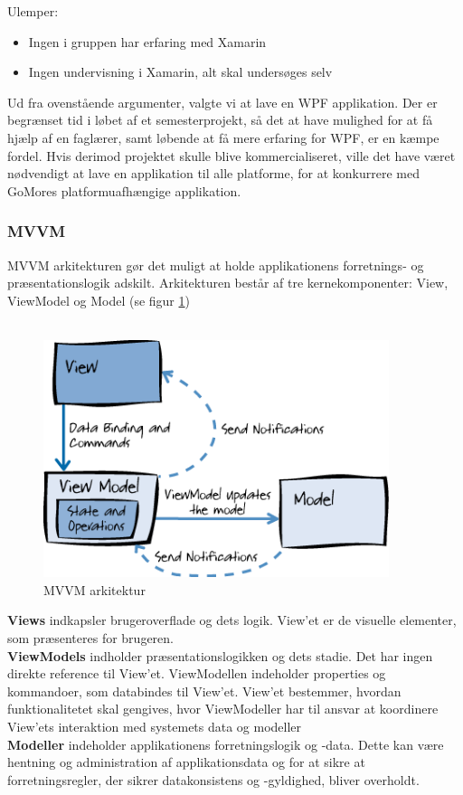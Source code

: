 \documentclass[a4paper,12pt,fleqn,oneside]{article}
\begin{document}
Ulemper: \\
\begin{itemize}
    \item Ingen i gruppen har erfaring med Xamarin 
    \item Ingen undervisning i Xamarin, alt skal undersøges selv
\end{itemize}
Ud fra ovenstående argumenter, valgte vi at lave en WPF applikation. Der er begrænset tid i løbet af et semesterprojekt, så det at have mulighed for at få hjælp af en faglærer, samt løbende at få mere erfaring for WPF, er en kæmpe fordel. Hvis derimod projektet skulle blive kommercialiseret, ville det have været nødvendigt at lave en applikation til alle platforme, for at konkurrere med GoMores platformuafhængige applikation. 
\subsubsection{MVVM}
MVVM arkitekturen gør det muligt at holde applikationens forretnings- og præsentationslogik adskilt. Arkitekturen består af tre kernekomponenter: View, ViewModel og Model (se figur \ref{fig:MVVM_pic}) \\\\
\begin{figure}[H]
    \centering
    \includegraphics[width=0.90\textwidth]{Rapport/Analyse/graphics/MVVM.png}
    \caption{MVVM arkitektur}
    \label{fig:MVVM_pic}
\end{figure}
\textbf{Views} indkapsler brugeroverflade og dets logik. View'et er de visuelle elementer, som præsenteres for brugeren. \\
\textbf{ViewModels} indholder præsentationslogikken og dets stadie. Det har ingen direkte reference til View'et. ViewModellen indeholder properties og kommandoer, som databindes til View'et. View'et bestemmer, hvordan funktionalitetet skal gengives, hvor ViewModeller har til ansvar at koordinere View'ets interaktion med systemets data og modeller\\
\textbf{Modeller} indeholder applikationens forretningslogik og -data. Dette kan være hentning og administration af applikationsdata og for at sikre at forretningsregler, der sikrer datakonsistens og -gyldighed, bliver overholdt. 
\end{document}
